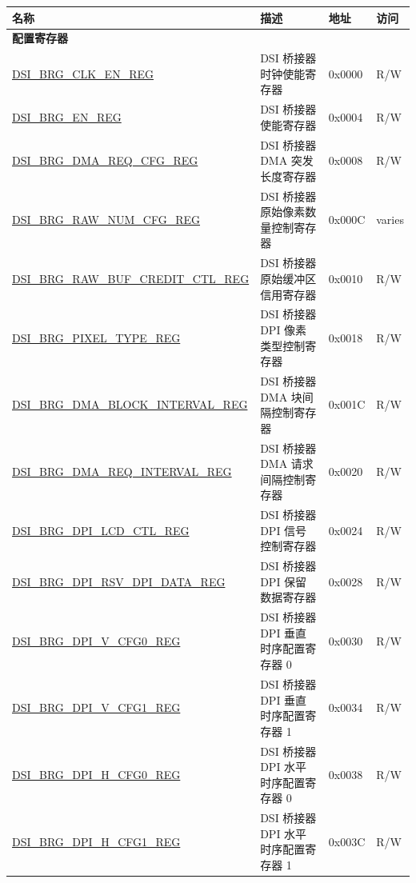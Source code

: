 \begin{longtable}{ | p{6.8cm} | p{6.5cm} | p{1.2cm} | p{1cm} | }
\hline\rowcolor{lightgray}
名称 & 描述 & 地址 & 访问 \\ \hline
\endhead
\multicolumn{4}{|l|}{\textbf{配置寄存器}} \\ \hline
\hyperref[regdesc:DSIBRGCLKENREG]{DSI\_BRG\_CLK\_EN\_REG} & DSI 桥接器时钟使能寄存器 & 0x0000 & R/W \\ \hline
\hyperref[regdesc:DSIBRGENREG]{DSI\_BRG\_EN\_REG} & DSI 桥接器使能寄存器 & 0x0004 & R/W \\ \hline
\hyperref[regdesc:DSIBRGDMAREQCFGREG]{DSI\_BRG\_DMA\_REQ\_CFG\_REG} & DSI 桥接器 DMA 突发长度寄存器 & 0x0008 & R/W \\ \hline
\hyperref[regdesc:DSIBRGRAWNUMCFGREG]{DSI\_BRG\_RAW\_NUM\_CFG\_REG} & DSI 桥接器原始像素数量控制寄存器 & 0x000C & varies \\ \hline
\hyperref[regdesc:DSIBRGRAWBUFCREDITCTLREG]{DSI\_BRG\_RAW\_BUF\_CREDIT\_CTL\_REG} & DSI 桥接器原始缓冲区信用寄存器 & 0x0010 & R/W \\ \hline
\hyperref[regdesc:DSIBRGPIXELTYPEREG]{DSI\_BRG\_PIXEL\_TYPE\_REG} & DSI 桥接器 DPI 像素类型控制寄存器 & 0x0018 & R/W \\ \hline
\hyperref[regdesc:DSIBRGDMABLOCKINTERVALREG]{DSI\_BRG\_DMA\_BLOCK\_INTERVAL\_REG} & DSI 桥接器 DMA 块间隔控制寄存器 & 0x001C & R/W \\ \hline
\hyperref[regdesc:DSIBRGDMAREQINTERVALREG]{DSI\_BRG\_DMA\_REQ\_INTERVAL\_REG} & DSI 桥接器 DMA 请求间隔控制寄存器 & 0x0020 & R/W \\ \hline
\hyperref[regdesc:DSIBRGDPILCDCTLREG]{DSI\_BRG\_DPI\_LCD\_CTL\_REG} & DSI 桥接器 DPI 信号控制寄存器 & 0x0024 & R/W \\ \hline
\hyperref[regdesc:DSIBRGDPIRSVDPIDATAREG]{DSI\_BRG\_DPI\_RSV\_DPI\_DATA\_REG} & DSI 桥接器 DPI 保留数据寄存器 & 0x0028 & R/W \\ \hline
\hyperref[regdesc:DSIBRGDPIVCFG0REG]{DSI\_BRG\_DPI\_V\_CFG0\_REG} & DSI 桥接器 DPI 垂直时序配置寄存器 0 & 0x0030 & R/W \\ \hline
\hyperref[regdesc:DSIBRGDPIVCFG1REG]{DSI\_BRG\_DPI\_V\_CFG1\_REG} & DSI 桥接器 DPI 垂直时序配置寄存器 1 & 0x0034 & R/W \\ \hline
\hyperref[regdesc:DSIBRGDPIHCFG0REG]{DSI\_BRG\_DPI\_H\_CFG0\_REG} & DSI 桥接器 DPI 水平时序配置寄存器 0 & 0x0038 & R/W \\ \hline
\hyperref[regdesc:DSIBRGDPIHCFG1REG]{DSI\_BRG\_DPI\_H\_CFG1\_REG} & DSI 桥接器 DPI 水平时序配置寄存器 1 & 0x003C & R/W \\ \hline

\end{longtable}
